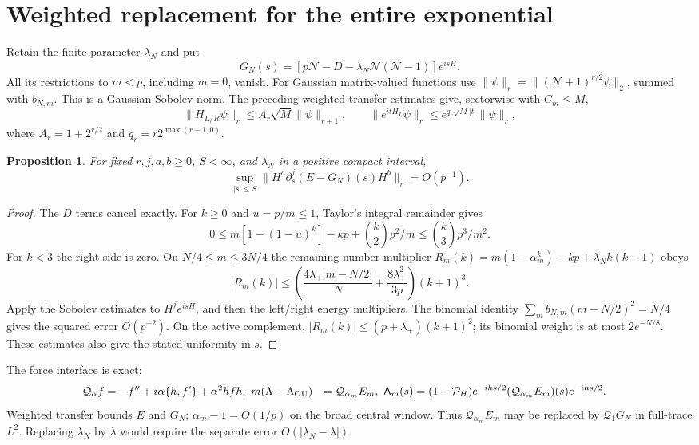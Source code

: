 \documentclass[11pt]{article}
\newcommand{\NN}{\mathcal N}
\newcommand{\PP}{\mathcal P_H}
\newcommand{\QQ}{\mathcal Q}
\newtheorem{proposition}{Proposition}
\begin{document}
\newpage
\section{Weighted replacement for the entire exponential}
Retain the finite parameter $\lambda_N$ and put
\begin{equation}
 G_N(s)=[p\NN-D-\lambda_N\NN(\NN-1)]e^{isH}.\label{eq:G}
\end{equation}
All its restrictions to $m<p$, including $m=0$, vanish.
For Gaussian matrix-valued functions use
$\|\psi\|_r=\|(\NN+1)^{r/2}\psi\|_2$, summed with $b_{N,m}$.
This is a Gaussian Sobolev norm. The preceding weighted-transfer
estimates \cite{Uniform} give, sectorwise with $C_m\le M$,
\begin{equation}
 \|H_{L/R}\psi\|_r\le A_r\sqrt M\|\psi\|_{r+1},\qquad
 \|e^{itH_L}\psi\|_r\le e^{q_r\sqrt M|t|}\|\psi\|_r,
\end{equation}
where $A_r=1+2^{r/2}$ and $q_r=r2^{\max(r-1,0)}$.

\begin{proposition}
For fixed $r,j,a,b\ge0$, $S<\infty$, and $\lambda_N$ in a positive
compact interval,
\begin{equation}
 \sup_{|s|\le S}\|H^a\partial_s^j(E-G_N)(s)H^b\|_r=O(p^{-1}).
 \label{eq:weighted}
\end{equation}
\end{proposition}
\begin{proof}
The $D$ terms cancel exactly. For $k\ge0$ and $u=p/m\le1$,
Taylor's integral remainder gives
\begin{equation}
0\le m[1-(1-u)^k]-kp+\binom k2p^2/m
 \le\binom k3p^3/m^2.\label{eq:Taylor}
\end{equation}
For $k<3$ the right side is zero. On $N/4\le m\le3N/4$ the
remaining number multiplier $R_m(k)=m(1-\alpha_m^k)-kp+
\lambda_Nk(k-1)$ obeys
\begin{equation}
 |R_m(k)|\le
 \left(\frac{4\lambda_+|m-N/2|}{N}
       +\frac{8\lambda_+^2}{3p}\right)(k+1)^3.\label{eq:R}
\end{equation}
Apply the Sobolev estimates to $H^je^{isH}$, and then the left/right
energy multipliers. The binomial identity
$\sum_m b_{N,m}(m-N/2)^2=N/4$ gives the squared error $O(p^{-2})$.
On the active complement, $|R_m(k)|\le(p+\lambda_+)(k+1)^2$;
its binomial weight is at most $2e^{-N/8}$. These estimates also
give the stated uniformity in $s$.
\end{proof}

The force interface is exact:
\begin{align}
 \QQ_\alpha f&=-f''+i\alpha\{h,f'\}+\alpha^2hfh,\
 m(\Lambda-\Lambda_{\rm OU})&=\QQ_{\alpha_m}E_m,\
 \mathsf A_m(s)&=(1-\PP)e^{-ihs/2}(\QQ_{\alpha_m}E_m)(s)e^{-ihs/2}.
\end{align}
Weighted transfer bounds $E$ and $G_N$; $\alpha_m-1=O(1/p)$ on
the broad central window. Thus $\QQ_{\alpha_m}E_m$ may be replaced
by $\QQ_1G_N$ in full-trace $L^2$. Replacing $\lambda_N$ by $\lambda$
would require the separate error $O(|\lambda_N-\lambda|)$.
\end{document}
